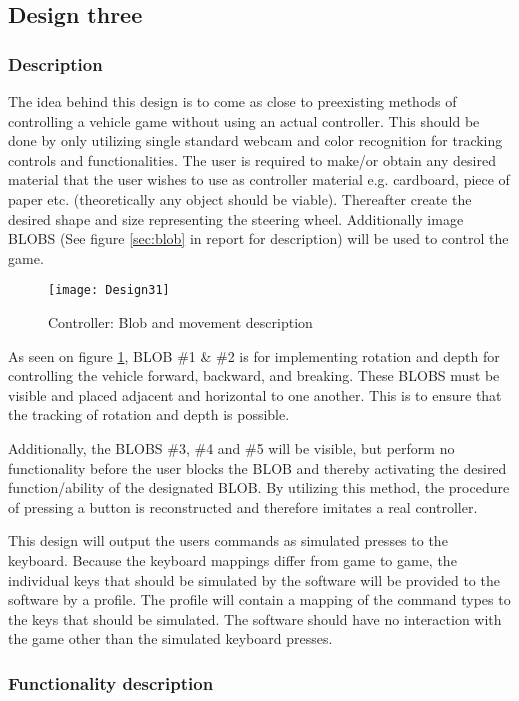 \subsection{Design three}
\label{design3}
\subsubsection*{Description}
The idea behind this design is to come as close to preexisting methods of controlling a vehicle game without using an actual controller. This should be done by only utilizing single standard webcam and color recognition for tracking controls and functionalities. The user is required to make/or obtain any desired material that the user wishes to use as controller material e.g. cardboard, piece of paper etc. (theoretically any object should be viable). Thereafter create the desired shape and size representing the steering wheel. 
Additionally image BLOBS (See figure \ref{sec:blob} in report for description) will be used to control the game. 
\begin{figure}[h]
\centering
\texttt{[image: Design31]}
\caption{Controller: Blob and movement description}
\label{fig:design31}
\end{figure}

As seen on figure \ref{fig:design31}, BLOB \#1 \& \#2 is for implementing rotation and depth for controlling the vehicle forward, backward, and breaking. These BLOBS must be visible and placed adjacent and horizontal to one another. This is to ensure that the tracking of rotation and depth is possible.

Additionally, the BLOBS \#3, \#4 and \#5 will be visible, but perform no functionality before the user blocks the BLOB and thereby activating the desired function/ability of the designated BLOB. By utilizing this method, the procedure of pressing a button is reconstructed and therefore imitates a real controller.
\bigskip

This design will output the users commands as simulated presses to the keyboard. 
Because the keyboard mappings differ from game to game, the individual keys that should be simulated by the software will be provided to the software by a profile.
The profile will contain a mapping of the command types to the keys that should be simulated. 
The software should have no interaction with the game other than the simulated keyboard presses.

\subsubsection*{Functionality description} \label{Dfunc}

